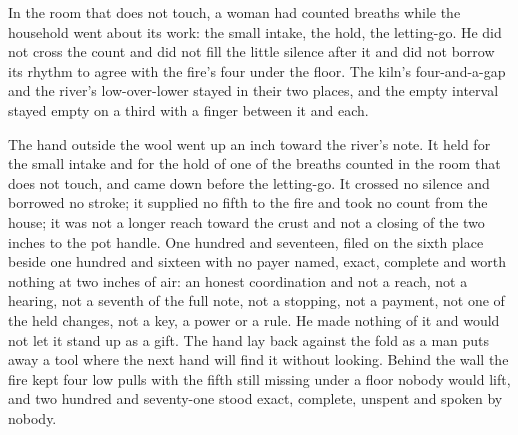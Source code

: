 In the room that does not touch, a woman had counted breaths while the household went about its work: the small intake, the hold, the letting-go. He did not cross the count and did not fill the little silence after it and did not borrow its rhythm to agree with the fire's four under the floor. The kiln's four-and-a-gap and the river's low-over-lower stayed in their two places, and the empty interval stayed empty on a third with a finger between it and each.

The hand outside the wool went up an inch toward the river's note. It held for the small intake and for the hold of one of the breaths counted in the room that does not touch, and came down before the letting-go. It crossed no silence and borrowed no stroke; it supplied no fifth to the fire and took no count from the house; it was not a longer reach toward the crust and not a closing of the two inches to the pot handle. One hundred and seventeen, filed on the sixth place beside one hundred and sixteen with no payer named, exact, complete and worth nothing at two inches of air: an honest coordination and not a reach, not a hearing, not a seventh of the full note, not a stopping, not a payment, not one of the held changes, not a key, a power or a rule. He made nothing of it and would not let it stand up as a gift. The hand lay back against the fold as a man puts away a tool where the next hand will find it without looking. Behind the wall the fire kept four low pulls with the fifth still missing under a floor nobody would lift, and two hundred and seventy-one stood exact, complete, unspent and spoken by nobody.
